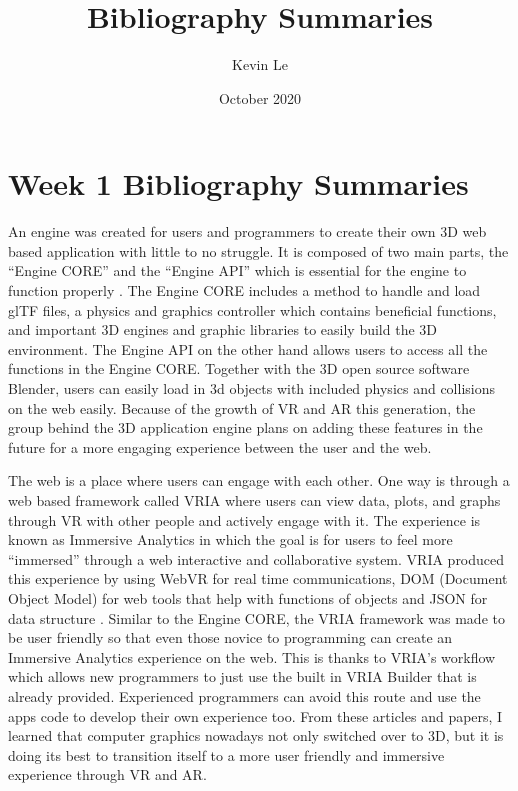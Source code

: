 \documentclass{article}
\title{Bibliography Summaries}
\author{Kevin Le}
\date{October 2020}
\begin{document}
\maketitle

\section{Week 1 Bibliography Summaries}

	An engine was created for users and programmers to create their own 3D web based application with little to no struggle. It is composed of two main parts, the “Engine CORE” and the “Engine API” which is essential for the engine to function properly \cite{8955392}. The Engine CORE includes a method to handle and load glTF files, a physics and graphics controller which contains beneficial functions, and important 3D engines and graphic libraries to easily build the 3D environment. The Engine API on the other hand allows users to access all the functions in the Engine CORE. Together with the 3D open source software Blender, users can easily load in 3d objects with included physics and collisions on the web easily. Because of the growth of VR and AR this generation, the group behind the 3D application engine plans on adding these features in the future for a more engaging experience between the user and the web.
	
	The web is a place where users can engage with each other. One way is through a web based framework called VRIA where users can view data, plots, and graphs through VR with other people and actively engage with it. The experience is known as Immersive Analytics in which the goal is for users to feel more “immersed” through a web interactive and collaborative system. VRIA produced this experience by using WebVR for real time communications, DOM (Document Object Model) for web tools that help with functions of objects and JSON for data structure \cite{8954824}. Similar to the Engine CORE, the VRIA framework was made to be user friendly so that even those novice to programming can create an Immersive Analytics experience on the web. This is thanks to VRIA’s workflow which allows new programmers to just use the built in VRIA Builder that is already provided. Experienced programmers can avoid this route and use the apps code to develop their own experience too. From these articles and papers, I learned that computer graphics nowadays not only switched over to 3D, but it is doing its best to transition itself to a more user friendly and immersive experience through VR and AR. 
\end{document}

